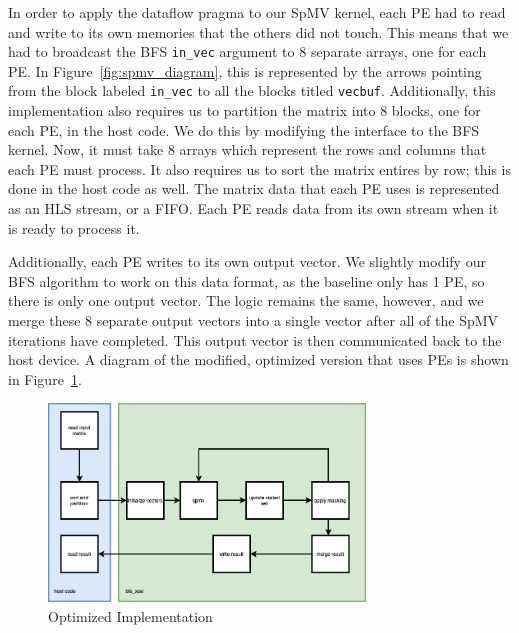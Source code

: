 \documentclass[10pt]{article}
\begin{document}
In order to apply the dataflow pragma to our SpMV kernel, each PE had to read and write to its own
memories that the others did not touch. This means that we had to broadcast the BFS \verb|in_vec| argument
to 8 separate arrays, one for each PE. In Figure~\ref{fig:spmv_diagram}, this is represented by the
arrows pointing from the block labeled \verb|in_vec| to all the blocks titled \verb|vecbuf|. Additionally,
this implementation also requires us to partition the matrix into 8 blocks, one for each PE, in the host
code. We do this by modifying the interface to the BFS kernel. Now, it must take 8 arrays which represent
the rows and columns that each PE must process. It also requires us to sort the matrix entires by row;
this is done in the host code as well. The matrix data that each PE uses is represented as an HLS stream,
or a FIFO. Each PE reads data from its own stream when it is ready to process it.

Additionally, each PE writes to its own output vector. We slightly modify our BFS algorithm to work
on this data format, as the baseline only has 1 PE, so there is only one output vector. The logic remains
the same, however, and we merge these 8 separate output vectors into a single vector after all of the
SpMV iterations have completed. This output vector is then communicated back to the host device. A diagram
of the modified, optimized version that uses PEs is shown in Figure~\ref{fig:bfs_opt}.

\begin{figure}[h!]
  \centering
  \includegraphics[width=0.75\textwidth]{bfs_opt.png}
  \caption{Optimized Implementation}
  \label{fig:bfs_opt}
\end{figure}
\end{document}
